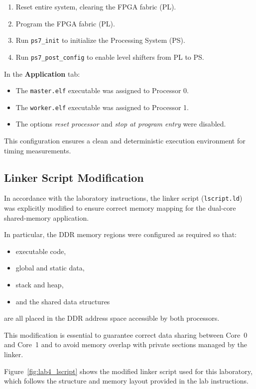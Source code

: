 \begin{enumerate}
    \item Reset entire system, clearing the FPGA fabric (PL).
    \item Program the FPGA fabric (PL).
    \item Run \texttt{ps7\_init} to initialize the Processing System (PS).
    \item Run \texttt{ps7\_post\_config} to enable level shifters from PL to PS.
\end{enumerate}

In the \textbf{Application} tab:
\begin{itemize}
    \item The \texttt{master.elf} executable was assigned to Processor 0.
    \item The \texttt{worker.elf} executable was assigned to Processor 1.
    \item The options \textit{reset processor} and \textit{stop at program entry} were disabled.
\end{itemize}

This configuration ensures a clean and deterministic execution environment for timing measurements.



\subsection*{Linker Script Modification}

In accordance with the laboratory instructions, the linker script
(\texttt{lscript.ld}) was explicitly modified to ensure correct memory
mapping for the dual-core shared-memory application.

In particular, the DDR memory regions were configured as required so that:
\begin{itemize}
    \item executable code,
    \item global and static data,
    \item stack and heap,
    \item and the shared data structures
\end{itemize}
are all placed in the DDR address space accessible by both processors.

This modification is essential to guarantee correct data sharing between
Core~0 and Core~1 and to avoid memory overlap with private sections
managed by the linker.

Figure~\ref{fig:lab4_lscript} shows the modified linker script used for this laboratory,
which follows the structure and memory layout provided in the lab instructions.

